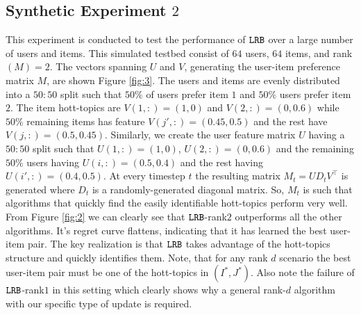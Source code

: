 \subsection{Synthetic Experiment $2$}
This experiment is conducted to test the performance of ${\tt LRB}$ over a large number of users and items. This simulated testbed consist of $64$ users, $64$ items, and rank$(M) = 2$. The vectors spanning $U$ and $V$, generating the user-item preference matrix $M$, are shown Figure \ref{fig:3}. The users and items are evenly distributed into a $50:50$ split such that $50\%$ of users prefer item $1$ and $50\%$ users prefer item $2$. The item hott-topics are $V(1,:) = (1,0)$ and $V(2,:) = (0, 0.6)$ while $50\%$ remaining  items has feature $V(j',:) = (0.45, 0.5)$ and the rest have $V(j,:) = (0.5, 0.45)$. Similarly, we create the user feature matrix $U$ having a $50:50$ split such that $U(1,:) = (1,0)$, $U(2,:) = (0,0.6)$ and the remaining $50\%$ users having $U(i,:) = (0.5,0.4)$ and the rest having $U(i',:) = (0.4,0.5)$. At every timestep $t$ the resulting matrix $M_t =UD_tV^{\intercal}$ is generated where $D_t$ is a randomly-generated diagonal matrix. So, $M_t$ is such that algorithms that quickly  find the easily identifiable hott-topics perform very well.  From Figure \ref{fig:2} we can clearly see that ${\tt LRB}$-rank$2$ outperforms all the other algorithms. It's  regret curve flattens, indicating that it has learned the best user-item pair. The key realization is that ${\tt LRB}$ takes advantage of the hott-topics structure and quickly identifies them. Note, that for any rank $d$ scenario  the best user-item pair must be one of the hott-topics in $(I^*, J^*)$. Also note the failure of ${\tt LRB}$-rank$1$ in this setting which clearly shows why a general rank-$d$ algorithm with our specific type of update is required. 



